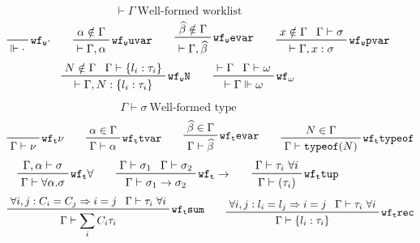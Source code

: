 \documentclass[letterpaper]{article}
\newcommand{\utv}{\alpha}             %
\newcommand{\etv}{{\widehat{\beta}}}  %
\begin{document}
\begin{figure}
  $$ \boxed{\vdash\Gamma}\ \textrm{Well-formed worklist} $$
  $$ \prfbyaxiom{$\mathtt{wf_w\cdot}$}{\Vdash\cdot}\qquad
     \prftree[r]{$\mathtt{wf_w uvar}$}
             {\prfassumption{\utv\notin\Gamma}}
             {\vdash\Gamma, \utv}\qquad
     \prftree[r]{$\mathtt{wf_w evar}$}
             {\prfassumption{\etv\notin\Gamma}}
             {\vdash\Gamma, \etv}\qquad
     \prftree[r]{$\mathtt{wf_w pvar}$}
             {\prfassumption{x\notin\Gamma}}{\prfassumption{\Gamma\vdash\sigma}}
             {\vdash\Gamma, x:\sigma} $$
  $$ \prftree[r]{$\mathtt{wf_w N}$}
             {\prfassumption{N\notin\Gamma}}{\prfassumption{\Gamma\vdash\{l_i:\tau_i\}}}
             {\vdash\Gamma, N:\{l_i:\tau_i\}}\qquad
     \prftree[r]{$\mathtt{wf_\omega}$}
             {\prfassumption{\vdash\Gamma}}{\prfassumption{\Gamma\vdash\omega}}
             {\vdash\Gamma\Vdash\omega} $$

  $$ \boxed{\Gamma\vdash\sigma}\ \textrm{Well-formed type}  $$
  $$ \prfbyaxiom{$\mathtt{wf_t \nu}$}{\Gamma\vdash\nu}\qquad
     \prftree[r]{$\mathtt{wf_t tvar}$}
             {\prfassumption{\utv\in\Gamma}}
             {\Gamma\vdash\utv}\qquad
     \prftree[r]{$\mathtt{wf_t evar}$}
             {\prfassumption{\etv\in\Gamma}}
             {\Gamma\vdash\etv}\qquad
     \prftree[r]{$\mathtt{wf_t typeof}$}
             {\prfassumption{N\in\Gamma}}
             {\Gamma\vdash\texttt{typeof}(N)} $$
  $$ \prftree[r]{$\mathtt{wf_t \forall}$}
             {\prfassumption{\Gamma,\utv\vdash\sigma}}
             {\Gamma\vdash\forall\utv.\sigma}\qquad
     \prftree[r]{$\mathtt{wf_t \rightarrow}$}
             {\prfassumption{\Gamma\vdash\sigma_1}}{\prfassumption{\Gamma\vdash\sigma_2}}
             {\Gamma\vdash\sigma_1\rightarrow\sigma_2}\qquad
     \prftree[r]{$\mathtt{wf_t tup}$}
             {\prfassumption{\Gamma\vdash\tau_i\ \forall i}}
             {\Gamma\vdash(\tau_i)} $$
  $$ \prftree[r]{$\mathtt{wf_t sum}$}
             {\prfassumption{\forall i,j:C_i=C_j\Rightarrow i=j}}
             {\prfassumption{\Gamma\vdash\tau_i\ \forall i}}
             {\Gamma\vdash\sum_i C_i\tau_i}\qquad
     \prftree[r]{$\mathtt{wf_t rec}$}
             {\prfassumption{\forall i,j:l_i=l_j\Rightarrow i=j}}
             {\prfassumption{\Gamma\vdash\tau_i\ \forall i}}
             {\Gamma\vdash\{l_i:\tau_i\}} $$


\end{figure}
\end{document}
